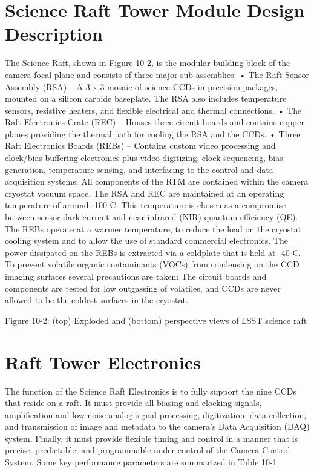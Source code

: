 \section{Science Raft Tower Module Design Description}
The Science Raft, shown in Figure 10-2, is the modular building block of the camera focal plane and consists of three major sub-assemblies:
•	The Raft Sensor Assembly (RSA) – A 3 x 3 mosaic of science CCDs in precision packages, mounted on a silicon carbide baseplate. The RSA also includes temperature sensors, resistive heaters, and flexible electrical and thermal connections.
•	The Raft Electronics Crate (REC) – Houses three circuit boards and contains copper planes providing the thermal path for cooling the RSA and the CCDs.
•	Three Raft Electronics Boards (REBs) – Contains custom video processing and clock/bias buffering electronics plus video digitizing, clock sequencing, bias generation, temperature sensing, and interfacing to the control and data acquisition systems. 
All components of the RTM are contained within the camera cryostat vacuum space. The RSA and REC are maintained at an operating temperature of around -100 C. This temperature is chosen as a compromise between sensor dark current and near infrared (NIR) quantum efficiency (QE). The REBs operate at a warmer temperature, to reduce the load on the cryostat cooling system and to allow the use of standard commercial electronics. The power dissipated on the REBs is extracted via a coldplate that is held at -40 C. To prevent volatile organic contaminants (VOCs) from condensing on the CCD imaging surfaces several precautions are taken: The circuit boards and components are tested for low outgassing of volatiles, and CCDs are never allowed to be the coldest surfaces in the cryostat. 
 
  
Figure 10-2: (top) Exploded and (bottom) perspective views of LSST science raft 

\section{Raft Tower Electronics}
The function of the Science Raft Electronics is to fully support the nine CCDs that reside on a raft. It must provide all biasing and clocking signals, amplification and low noise analog signal processing, digitization, data collection, and transmission of image and metadata to the camera’s Data Acquisition (DAQ) system. Finally, it must provide flexible timing and control in a manner that is precise, predictable, and programmable under control of the Camera Control System. Some key performance parameters are summarized in Table 10-1.

